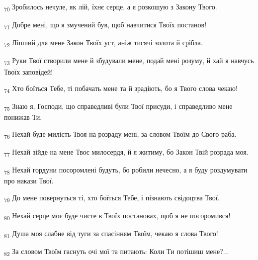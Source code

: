 \begin{tcolorbox}
\textsubscript{70} Зробилось нечуле, як лій, їхнє серце, а я розкошую з Закону Твого.
\end{tcolorbox}
\begin{tcolorbox}
\textsubscript{71} Добре мені, що я змучений був, щоб навчитися Твоїх постанов!
\end{tcolorbox}
\begin{tcolorbox}
\textsubscript{72} Ліпший для мене Закон Твоїх уст, аніж тисячі золота й срібла.
\end{tcolorbox}
\begin{tcolorbox}
\textsubscript{73} Руки Твої створили мене й збудували мене, подай мені розуму, й хай я навчусь Твоїх заповідей!
\end{tcolorbox}
\begin{tcolorbox}
\textsubscript{74} Хто боїться Тебе, ті побачать мене та й зрадіють, бо я Твого слова чекаю!
\end{tcolorbox}
\begin{tcolorbox}
\textsubscript{75} Знаю я, Господи, що справедливі були Твої присуди, і справедливо мене понижав Ти.
\end{tcolorbox}
\begin{tcolorbox}
\textsubscript{76} Нехай буде милість Твоя на розраду мені, за словом Твоїм до Свого раба.
\end{tcolorbox}
\begin{tcolorbox}
\textsubscript{77} Нехай зійде на мене Твоє милосердя, й я житиму, бо Закон Твій розрада моя.
\end{tcolorbox}
\begin{tcolorbox}
\textsubscript{78} Нехай гордуни посоромлені будуть, бо робили нечесно, а я буду роздумувати про накази Твої.
\end{tcolorbox}
\begin{tcolorbox}
\textsubscript{79} До мене повернуться ті, хто боїться Тебе, і пізнають свідоцтва Твої.
\end{tcolorbox}
\begin{tcolorbox}
\textsubscript{80} Нехай серце моє буде чисте в Твоїх постановах, щоб я не посоромився!
\end{tcolorbox}
\begin{tcolorbox}
\textsubscript{81} Душа моя слабне від туги за спасінням Твоїм, чекаю я слова Твого!
\end{tcolorbox}
\begin{tcolorbox}
\textsubscript{82} За словом Твоїм гаснуть очі мої та питають: Коли Ти потішиш мене?...
\end{tcolorbox}
